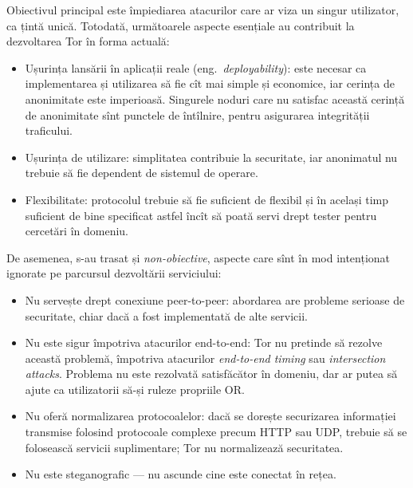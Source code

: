 Obiectivul principal este împiediarea atacurilor care ar viza un singur
utilizator, ca țintă unică. Totodată, următoarele aspecte esențiale au
contribuit la dezvoltarea Tor în forma actuală:
\begin{itemize}
  \item Ușurința lansării în aplicații reale (eng.\ \emph{deployability}): este
    necesar ca implementarea și utilizarea să fie cît mai simple și
    economice, iar cerința de anonimitate este imperioasă. Singurele
    noduri care nu satisfac această cerință de anonimitate sînt punctele
    de întîlnire, pentru asigurarea integrității traficului.
  \item Ușurința de utilizare: simplitatea contribuie la securitate, iar
    anonimatul nu trebuie să fie dependent de sistemul de operare.
  \item Flexibilitate: protocolul trebuie să fie suficient de flexibil și
    în același timp suficient de bine specificat astfel încît să poată
    servi drept tester pentru cercetări în domeniu.
\end{itemize}

De asemenea, s-au trasat și \emph{non-obiective}, aspecte care sînt
în mod intenționat ignorate pe parcursul dezvoltării serviciului:
\begin{itemize}
  \item Nu servește drept conexiune peer-to-peer: abordarea are probleme
    serioase de securitate, chiar dacă a fost implementată de alte servicii.
  \item Nu este sigur împotriva atacurilor end-to-end: Tor nu pretinde
    să rezolve această problemă, împotriva atacurilor \emph{end-to-end timing}
    sau \emph{intersection attacks}. Problema nu este rezolvată satisfăcător
    în domeniu, dar ar putea să ajute ca utilizatorii să-și ruleze propriile
    OR.
  \item Nu oferă normalizarea protocoalelor: dacă se dorește securizarea
    informației transmise folosind protocoale complexe precum HTTP sau UDP,
    trebuie să se folosească servicii suplimentare; Tor nu normalizează securitatea.
  \item Nu este steganografic --- nu ascunde cine este conectat în rețea.
\end{itemize}

